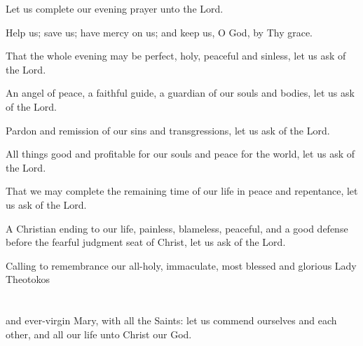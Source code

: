 \documentclass[twoside, letterpaper, 12pt]{report}
\begin{document}
\begin{maybetwocolumns}
\begin{deacon}
\item Let us complete our evening prayer unto the Lord.
\end{deacon}

\begin{deacon}
\item Help us; save us; have mercy on us; and keep us, O God, by Thy grace.
\end{deacon}

\begin{deacon}
\item That the whole evening may be perfect, holy, peaceful and sinless,
    let us ask of the Lord.
\end{deacon}


\begin{deacon}
\item An angel of peace, a faithful guide, a guardian of our souls and bodies,
    let us ask of the Lord.
\end{deacon}

\begin{deacon}
\item Pardon and remission of our sins and transgressions, let us ask of the Lord.
\item All things good and profitable for our souls and peace for the world, let us ask of the Lord.
\item That we may complete the remaining time of our life in peace and repentance, let
    us ask of the Lord.
\item A Christian ending to our life, painless, blameless, peaceful, and a good defense
    before the fearful judgment seat of Christ, let us ask of the Lord.
\item Calling to remembrance our all-holy, immaculate, most blessed and glorious Lady Theotokos\\
    \\
    \\
    and ever-virgin Mary, with all the Saints: let us commend ourselves and each other,
    and all our life unto Christ our God.
\end{deacon}


\end{maybetwocolumns}
\end{document}
